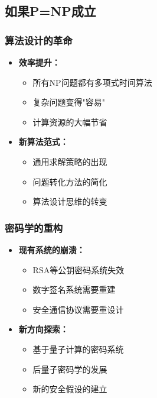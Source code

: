 \documentclass[a4paper,12pt]{ctexart}
\begin{document}
\subsection{如果P=NP成立}
\subsubsection{算法设计的革命}
\begin{itemize}
    \item \textbf{效率提升：}
        \begin{itemize}
            \item 所有NP问题都有多项式时间算法
            \item 复杂问题变得"容易"
            \item 计算资源的大幅节省
        \end{itemize}
    \item \textbf{新算法范式：}
        \begin{itemize}
            \item 通用求解策略的出现
            \item 问题转化方法的简化
            \item 算法设计思维的转变
        \end{itemize}
\end{itemize}

\subsubsection{密码学的重构}
\begin{itemize}
    \item \textbf{现有系统的崩溃：}
        \begin{itemize}
            \item RSA等公钥密码系统失效
            \item 数字签名系统需要重建
            \item 安全通信协议需要重设计
        \end{itemize}
    \item \textbf{新方向探索：}
        \begin{itemize}
            \item 基于量子计算的密码系统
            \item 后量子密码学的发展
            \item 新的安全假设的建立
        \end{itemize}
\end{itemize}
\end{document}
